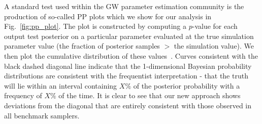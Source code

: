 %
%
A standard test used within the \ac{GW} parameter estimation community is the
production of so-called \ac{PP} plots which we show for our analysis in
Fig.~\ref{fig:pp_plot}. The plot is constructed by computing a $p$-value for each
output test posterior on a particular parameter evaluated at the true
simulation parameter value (the fraction of posterior samples $>$ the
simulation value). We then plot the cumulative distribution of these
values~\cite{1409.7215}. Curves consistent with the black dashed diagonal line
indicate that the 1-dimensional Bayesian probability distributions are
consistent with the frequentist interpretation - that the truth will lie within
an interval containing $X\%$ of the posterior probability with a frequency of
$X\%$ of the time. It is clear to see that our new approach shows deviations
from the diagonal that are entirely consistent with those observed in all
benchmark samplers. 

